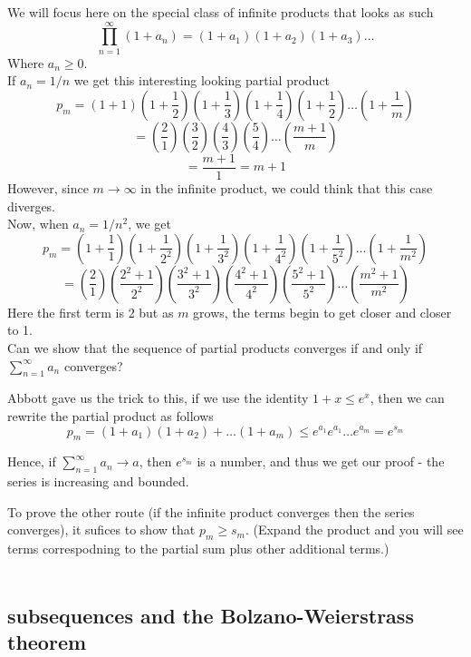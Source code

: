 We will focus here on the special class of infinite products that looks as such
$$
\prod^{\infty}_{n=1} (1 + a_n) = (1+a_1)(1+a_2)(1 +a_3)\ldots
$$
Where $a_n \geq 0$.
\\

If $a_n = 1/n$ we get this interesting looking partial product
$$
p_m = \left(1+1\right) \left(1+\frac{1}{2}\right) \left(1+\frac{1}{3}\right) \left(1+\frac{1}{4}\right) \left(1+\frac{1}{2}\right) \ldots \left(1+\frac{1}{m}\right)  
$$
$$
= \left(\frac{2}{1}\right) \left(\frac{3}{2}\right) \left(\frac{4}{3}\right) \left(\frac{5}{4}\right) \ldots \left(\frac{m+1}{m}\right) 
$$
$$
= \frac{m+1}{1} = m+1
$$
However, since $m \rightarrow \infty$ in the infinite product, we could think that this case diverges.
\\

Now, when $a_n = 1/n^2$, we get
$$
p_m =
\left(1+ \frac{1}{1} \right) \left(1+ \frac{1}{2^2} \right) \left(1+ \frac{1}{3^2} \right) \left(1+ \frac{1}{4^2} \right) \left(1+ \frac{1}{5^2} \right) \ldots \left(1+ \frac{1}{m^2} \right)
$$
$$
= \left(\frac{2}{1} \right) \left(\frac{2^2 +1}{2^2} \right) \left(\frac{3^2 +1}{3^2} \right) \left(\frac{4^2 +1}{4^2} \right) \left(\frac{5^2 +1}{5^2} \right) \ldots \left(\frac{m^2 +1}{m^2} \right)
$$
Here the first term is 2 but as $m$ grows, the terms begin to get closer and closer to 1.
\\


Can we show that the sequence of partial products converges if and only if
$\sum^{\infty}_{n=1} a_n$ converges?

Abbott gave us the trick to this, if we use the identity $1+x \leq e^x$, then we can rewrite the
partial product as follows
$$
p_m = (1+a_1) (1+a_2) + \ldots (1+a_m)
\leq e^{a_1} e^{a_1} \ldots e^{a_m}
= e^{s_m}
$$

Hence, if $\sum^{\infty}_{n=1} a_n \rightarrow a$, then $e^{s_m}$ is a number, and thus we get our
proof - the series is increasing and bounded.

To prove the other route (if the infinite product converges then the series converges),
it sufices to show that $p_m \geq s_m$. (Expand the product and you will see terms correspodning to
the partial sum plus other additional terms.)
\\~\\



\subsection{subsequences and the Bolzano-Weierstrass theorem}


